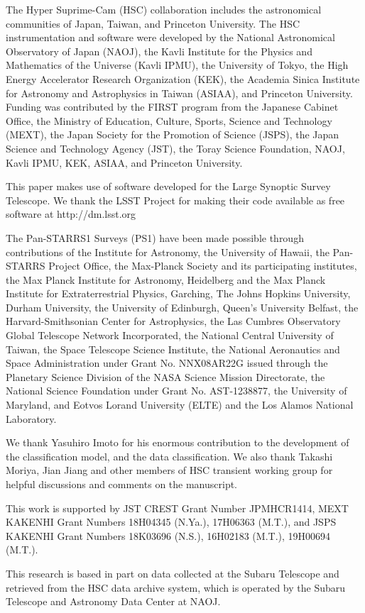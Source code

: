\documentclass[useamsfonts]{pasj01}
\begin{document}
\begin{ack}
The Hyper Suprime-Cam (HSC) collaboration includes the astronomical communities of Japan, Taiwan, and Princeton University. The HSC instrumentation and software were developed by the National Astronomical Observatory of Japan (NAOJ), the Kavli Institute for the Physics and Mathematics of the Universe (Kavli IPMU), the University of Tokyo, the High Energy Accelerator Research Organization (KEK), the Academia Sinica Institute for Astronomy and Astrophysics in Taiwan (ASIAA), and Princeton University. Funding was contributed by the FIRST program from the Japanese Cabinet Office, the Ministry of Education, Culture, Sports, Science and Technology (MEXT), the Japan Society for the Promotion of Science (JSPS), the Japan Science and Technology Agency (JST), the Toray Science Foundation, NAOJ, Kavli IPMU, KEK, ASIAA, and Princeton University.

This paper makes use of software developed for the Large Synoptic Survey Telescope. We thank the LSST Project for making their code available as free software at  http://dm.lsst.org

The Pan-STARRS1 Surveys (PS1) have been made possible through contributions of the Institute for Astronomy, the University of Hawaii, the Pan-STARRS Project Office, the Max-Planck Society and its participating institutes, the Max Planck Institute for Astronomy, Heidelberg and the Max Planck Institute for Extraterrestrial Physics, Garching, The Johns Hopkins University, Durham University, the University of Edinburgh, Queen’s University Belfast, the Harvard-Smithsonian Center for Astrophysics, the Las Cumbres Observatory Global Telescope Network Incorporated, the National Central University of Taiwan, the Space Telescope Science Institute, the National Aeronautics and Space Administration under Grant No. NNX08AR22G issued through the Planetary Science Division of the NASA Science Mission Directorate, the National Science Foundation under Grant No. AST-1238877, the University of Maryland, and Eotvos Lorand University (ELTE) and the Los Alamos National Laboratory.

We thank Yasuhiro Imoto for his enormous contribution to  the development of the classification model, and the data classification.
We also thank Takashi Moriya, Jian Jiang and other members of HSC transient working group for helpful discussions and comments on the manuscript.

This work is supported by JST CREST Grant Number JPMHCR1414, MEXT KAKENHI Grant Numbers 18H04345 (N.Ya.), 17H06363 (M.T.), and JSPS KAKENHI Grant Numbers 18K03696 (N.S.), 16H02183 (M.T.), 19H00694 (M.T.).

This research is based in part on data collected at the Subaru Telescope and retrieved from the HSC data archive system, which is operated by the Subaru Telescope and Astronomy Data Center at NAOJ.
\end{ack}
%
%
\appendix 
\end{document}
